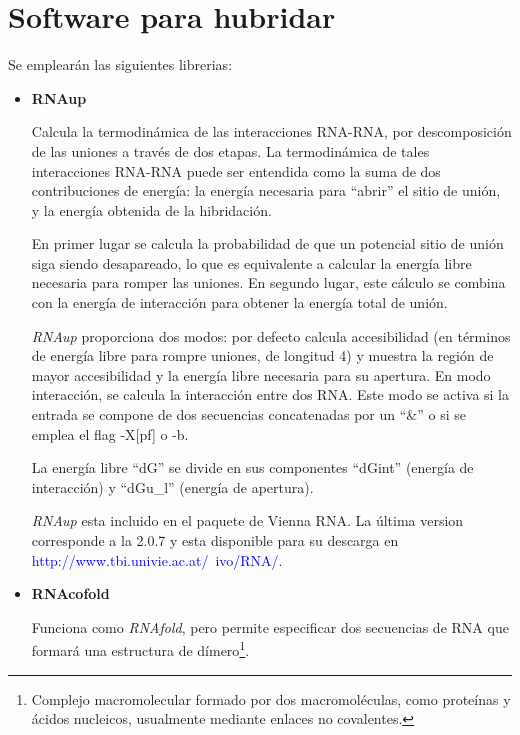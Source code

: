 \documentclass[12pt,a4paper,spanish]{article}
\begin{document}
\section{Software para hubridar}				
Se emplearán las siguientes librerias:
\begin{itemize}
    \item \textbf{RNAup} 
        \par Calcula la termodinámica de las interacciones RNA-RNA, por descomposición de las uniones a
         través de dos etapas. La termodinámica de tales interacciones RNA-RNA puede ser entendida como la 
         suma de dos contribuciones de energía: la energía necesaria para ``abrir'' el sitio de unión, y la
         energía obtenida de la hibridación.

        \par En primer lugar se calcula la probabilidad de que un potencial sitio de unión siga siendo
         desapareado, lo que es equivalente a calcular la energía libre necesaria para romper las uniones. En
         segundo lugar, este cálculo se combina con la energía de interacción para obtener la energía total
         de unión.

        \par \emph{RNAup} proporciona dos modos: por defecto calcula accesibilidad (en términos de energía
         libre para rompre uniones, de longitud 4) y muestra la región de mayor accesibilidad y la energía
         libre necesaria para su apertura. En modo interacción, se calcula la interacción entre dos RNA. Este
         modo se activa si la entrada se compone de dos secuencias concatenadas por un ``\&'' o si se emplea
         el flag -X[pf] o -b.

         \par  La energía libre ``dG'' se divide en sus componentes ``dGint'' (energía de interacción) y
         ``dGu\_l'' (energía de apertura).                      

         \par \emph{RNAup} esta incluido en el paquete de Vienna RNA\cite{11}. La última version corresponde a
         la 2.0.7 y esta disponible para su descarga en
         \textcolor{blue}{http://www.tbi.univie.ac.at/~ivo/RNA/}.

    \item \textbf{RNAcofold} 
            \par Funciona como \emph{RNAfold}, pero permite especificar dos secuencias de RNA que formará una
            estructura de dímero\footnote{Complejo macromolecular formado por dos macromoléculas, como
            proteínas y ácidos nucleicos, usualmente mediante enlaces no covalentes.}.


\end{itemize}
\end{document}
